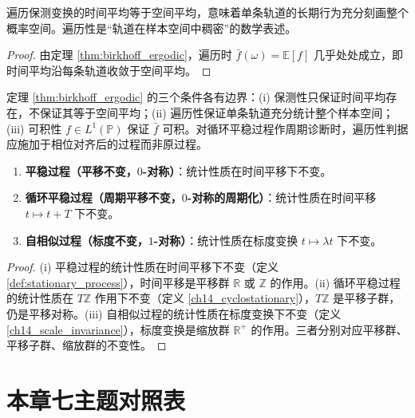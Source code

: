 \begin{corollary}\label{cor:ergodic_closure}
遍历保测变换的时间平均等于空间平均，意味着单条轨道的长期行为充分刻画整个概率空间。遍历性是“轨道在样本空间中稠密”的数学表述。
\end{corollary}

\begin{proof}
由定理 \ref{thm:birkhoff_ergodic}，遍历时 $\bar{f}(\omega) = \mathbb{E}[f]$ 几乎处处成立，即时间平均沿每条轨道收敛于空间平均。
\end{proof}

\begin{remark}[遍历定理的适用边界]\label{ch14_ergodic_scope_remark}
定理 \ref{thm:birkhoff_ergodic} 的三个条件各有边界：(i) 保测性只保证时间平均存在，不保证其等于空间平均；(ii) 遍历性保证单条轨道充分统计整个样本空间；(iii) 可积性 $f \in L^1(\mathbb{P})$ 保证 $\bar{f}$ 可积。对循环平稳过程作周期诊断时，遍历性判据应施加于相位对齐后的过程而非原过程。
\end{remark}

\begin{proposition}[三种时间尺度下的不变性]\label{prop:three_symmetry_stochastic}
\begin{enumerate}[label=(\roman*)]
    \item \textbf{平稳过程（平移不变，$0$-对称）}：统计性质在时间平移下不变。
    \item \textbf{循环平稳过程（周期平移不变，$0$-对称的周期化）}：统计性质在时间平移 $t \mapsto t + T$ 下不变。
    \item \textbf{自相似过程（标度不变，$1$-对称）}：统计性质在标度变换 $t \mapsto \lambda t$ 下不变。
\end{enumerate}
\end{proposition}

\begin{proof}
(i) 平稳过程的统计性质在时间平移下不变（定义 \ref{def:stationary_process}），时间平移是平移群 $\mathbb{R}$ 或 $\mathbb{Z}$ 的作用。(ii) 循环平稳过程的统计性质在 $T\mathbb{Z}$ 作用下不变（定义 \ref{ch14_cyclostationary}），$T\mathbb{Z}$ 是平移子群，仍是平移对称。(iii) 自相似过程的统计性质在标度变换下不变（定义 \ref{ch14_scale_invariance}），标度变换是缩放群 $\mathbb{R}^+$ 的作用。三者分别对应平移群、平移子群、缩放群的不变性。
\end{proof}

\section*{本章七主题对照表}

